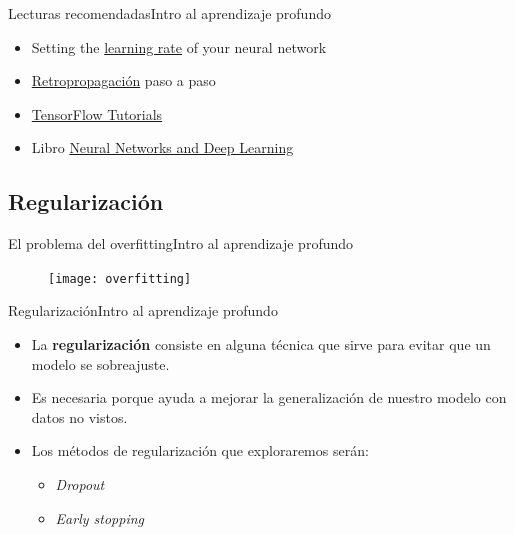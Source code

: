 \documentclass[10pt,border=3pt,tikz]{beamer}
\begin{document}
    \begin{frame}{Lecturas recomendadas}{Intro al aprendizaje profundo}
        \begin{itemize}
            \item Setting the   \colorbox{blue!10}{\href{https://www.jeremyjordan.me/nn-learning-rate/}{learning rate}} of your neural network
            \item \colorbox{blue!10}{\href{https://hmkcode.com/ai/backpropagation-step-by-step/}{Retropropagación}} paso a paso
            \item \colorbox{blue!10}{\href{https://www.tensorflow.org/tutorials}{TensorFlow Tutorials}}
            \item Libro \colorbox{blue!10}{\href{http://neuralnetworksanddeeplearning.com/}{Neural Networks and Deep Learning}}
        \end{itemize}
    \end{frame}
    
    \subsection{Regularización}
    
    \begin{frame}{El problema del overfitting}{Intro al aprendizaje profundo}
        \begin{figure}
            \centering
            \texttt{[image: overfitting]}
        \end{figure}
    \end{frame}
    
    \begin{frame}{Regularización}{Intro al aprendizaje profundo}
        \begin{itemize}
            \item La \textbf{regularización} consiste en alguna técnica que sirve para evitar que un modelo se sobreajuste.
            \item Es necesaria porque ayuda a mejorar la generalización de nuestro modelo con datos no vistos.
            \item Los métodos de regularización que exploraremos serán:
            \begin{itemize}
                \item \textit{Dropout}
                \item \textit{Early stopping}
            \end{itemize}
        \end{itemize}
    \end{frame}
    
\end{document}
